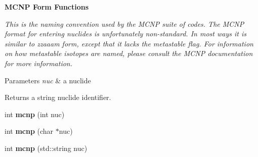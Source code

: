\begin{Indent}{\bf M\-C\-N\-P Form Functions}\par
{\em This is the naming convention used by the M\-C\-N\-P suite of codes. The M\-C\-N\-P format for entering nuclides is unfortunately non-\/standard. In most ways it is similar to zzaaam form, except that it lacks the metastable flag. For information on how metastable isotopes are named, please consult the M\-C\-N\-P documentation for more information. 
\begin{DoxyParams}{Parameters}
{\em nuc} & a nuclide \\
\hline
\end{DoxyParams}
\begin{DoxyReturn}{Returns}
a string nuclide identifier. 
\end{DoxyReturn}
}\begin{DoxyCompactItemize}
\item 
\hypertarget{namespacepyne_1_1nucname_a9b336037f24de5fb0a9f24bc6324cd40}{int {\bfseries mcnp} (int nuc)}\label{namespacepyne_1_1nucname_a9b336037f24de5fb0a9f24bc6324cd40}

\item 
\hypertarget{namespacepyne_1_1nucname_aee1f14debc9a04463ec1c3443dbdf4ba}{int {\bfseries mcnp} (char $\ast$nuc)}\label{namespacepyne_1_1nucname_aee1f14debc9a04463ec1c3443dbdf4ba}

\item 
\hypertarget{namespacepyne_1_1nucname_a3e05db49bed60a40e56a1798afcd33ea}{int {\bfseries mcnp} (std\-::string nuc)}\label{namespacepyne_1_1nucname_a3e05db49bed60a40e56a1798afcd33ea}

\end{DoxyCompactItemize}
\end{Indent}
